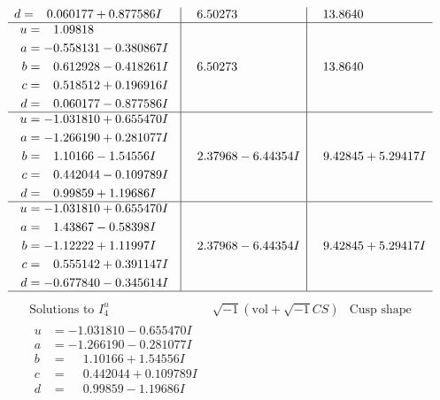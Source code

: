\documentclass[1p]{elsarticle_modified}
\theoremstyle{definition}
\newcommand{\I}{\sqrt{-1}}
\begin{document}
$$\begin{array}{c|c|c}
\begin{aligned}
d &= \phantom{-}0.060177 + 0.877586 I\end{aligned}
 & \phantom{-}6.50273\phantom{ +0.000000I} & \phantom{-}13.8640\phantom{ +0.000000I} \\ \hline\begin{aligned}
u &= \phantom{-}1.09818\phantom{ +0.000000I} \\
a &= -0.558131 - 0.380867 I \\
b &= \phantom{-}0.612928 - 0.418261 I \\
c &= \phantom{-}0.518512 + 0.196916 I \\
d &= \phantom{-}0.060177 - 0.877586 I\end{aligned}
 & \phantom{-}6.50273\phantom{ +0.000000I} & \phantom{-}13.8640\phantom{ +0.000000I} \\ \hline\begin{aligned}
u &= -1.031810 + 0.655470 I \\
a &= -1.266190 + 0.281077 I \\
b &= \phantom{-}1.10166 - 1.54556 I \\
c &= \phantom{-}0.442044 - 0.109789 I \\
d &= \phantom{-}0.99859 + 1.19686 I\end{aligned}
 & \phantom{-}2.37968 - 6.44354 I & \phantom{-}9.42845 + 5.29417 I \\ \hline\begin{aligned}
u &= -1.031810 + 0.655470 I \\
a &= \phantom{-}1.43867 - 0.58398 I \\
b &= -1.12222 + 1.11997 I \\
c &= \phantom{-}0.555142 + 0.391147 I \\
d &= -0.677840 - 0.345614 I\end{aligned}
 & \phantom{-}2.37968 - 6.44354 I & \phantom{-}9.42845 + 5.29417 I\\
 \hline 
 \end{array}$$\newpage$$\begin{array}{c|c|c}  
\text{Solutions to }I^u_{4}& \I (\text{vol} + \sqrt{-1}CS) & \text{Cusp shape}\\
 \hline 
\begin{aligned}
u &= -1.031810 - 0.655470 I \\
a &= -1.266190 - 0.281077 I \\
b &= \phantom{-}1.10166 + 1.54556 I \\
c &= \phantom{-}0.442044 + 0.109789 I \\
d &= \phantom{-}0.99859 - 1.19686 I\end{aligned}

\end{array}$$
\end{document}
